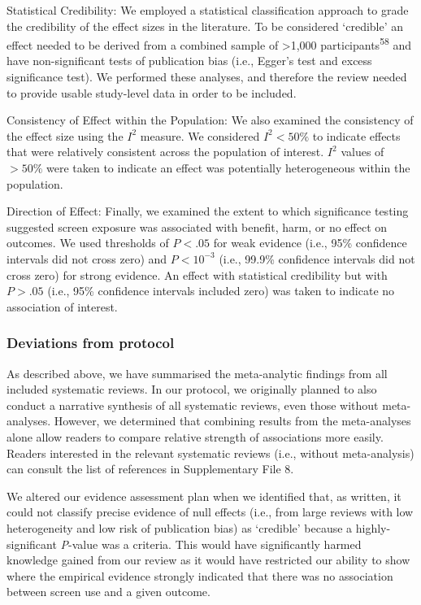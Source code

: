 \documentclass[
  english,
  man]{apa6}
\begin{document}
Statistical Credibility:
We employed a statistical classification approach to grade the credibility of the effect sizes in the literature.
To be considered `credible' an effect needed to be derived from a combined sample of \textgreater1,000 participants\textsuperscript{58} and have non-significant tests of publication bias (i.e., Egger's test and excess significance test).
We performed these analyses, and therefore the review needed to provide usable study-level data in order to be included.

Consistency of Effect within the Population:
We also examined the consistency of the effect size using the \(I^2\) measure.
We considered \(I^2 < 50\%\) to indicate effects that were relatively consistent across the population of interest.
\(I^2\) values of \(> 50\%\) were taken to indicate an effect was potentially heterogeneous within the population.

Direction of Effect:
Finally, we examined the extent to which significance testing suggested screen exposure was associated with benefit, harm, or no effect on outcomes.
We used thresholds of \(P < .05\) for weak evidence (i.e., 95\% confidence intervals did not cross zero) and \(P < 10^{-3}\) (i.e., 99.9\% confidence intervals did not cross zero) for strong evidence.
An effect with statistical credibility but with \(P > .05\) (i.e., 95\% confidence intervals included zero) was taken to indicate no association of interest.

\hypertarget{deviations-from-protocol}{%
\subsubsection{Deviations from protocol}\label{deviations-from-protocol}}

As described above, we have summarised the meta-analytic findings from all included systematic reviews.
In our protocol, we originally planned to also conduct a narrative synthesis of all systematic reviews, even those without meta-analyses.
However, we determined that combining results from the meta-analyses alone allow readers to compare relative strength of associations more easily.
Readers interested in the relevant systematic reviews (i.e., without meta-analysis) can consult the list of references in Supplementary File 8.

We altered our evidence assessment plan when we identified that, as written, it could not classify precise evidence of null effects (i.e., from large reviews with low heterogeneity and low risk of publication bias) as `credible' because a highly-significant \emph{P}-value was a criteria.
This would have significantly harmed knowledge gained from our review as it would have restricted our ability to show where the empirical evidence strongly indicated that there was no association between screen use and a given outcome.
\end{document}
